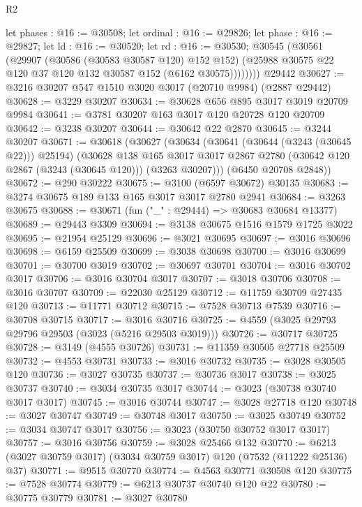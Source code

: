 \begin{lexlean}{R2}
\begin{coremodule}
          let phases : @16 := @30508;
          let ordinal : @16 := @29826;
          let phase : @16 := @29827;
          let ld : @16 := @30520;
          let rd : @16 := @30530;
          @30545
            (@30561
              (@29907
                (@30586 (@30583 @30587 @120) @152 @152)
                (@25988 @30575 @22 @120 @37 @120 @132 @30587 @152 (@6162 @30575))))))))
    @29442
@30627 := @3216 @30207 @547 @1510 @3020 @3017 (@20710 @9984) (@2887 @29442)
@30628 := @3229 @30207
@30634 := @30628 @656 @895 @3017 @3019 @20709 @9984
@30641 := @3781 @30207 @163 @3017 @120 @20728 @120 @20709
@30642 := @3238 @30207
@30644 := @30642 @22 @2870
@30645 := @3244 @30207
@30671 := @30618
    (@30627
      (@30634
        (@30641 (@30644 (@3243 (@30645 @22))) @25194)
        (@30628
          @138
          @165
          @3017
          @3017
          @2867
          @2780
          (@30642 @120 @2867 (@3243 (@30645 @120)))
          (@3263 @30207)))
      (@6450 @20708 @2848))
@30672 := @290 @30222
@30675 := @3100 (@6597 @30672) @30135
@30683 := @3274 @30675 @189 @133 @165 @3017 @3017 @2780 @2941
@30684 := @3263 @30675
@30688 := @30671 (fun ("_" : @29444) => @30683 @30684 @13377)
@30689 := @29443 @3309
@30694 := @3138 @30675 @1516 @1579 @1725 @3022
@30695 := @21954 @25129
@30696 := @3021 @30695
@30697 := @3016 @30696
@30698 := @6159 @25509
@30699 := @3038 @30698
@30700 := @3016 @30699
@30701 := @30700 @3019
@30702 := @30697 @30701
@30704 := @3016 @30702 @3017
@30706 := @3016 @30704 @3017
@30707 := @3018 @30706
@30708 := @3016 @30707
@30709 := @22030 @25129
@30712 := @11759 @30709 @27435 @120
@30713 := @11771 @30712
@30715 := @7528 @30713 @7539
@30716 := @30708 @30715
@30717 := @3016 @30716
@30725 := @4559 (@3025 @29793 @29796 @29503 (@3023 (@5216 @29503 @3019)))
@30726 := @30717 @30725
@30728 := @3149 (@4555 @30726)
@30731 := @11359 @30505 @27718 @25509
@30732 := @4553 @30731
@30733 := @3016 @30732
@30735 := @3028 @30505 @120
@30736 := @3027 @30735
@30737 := @30736 @3017
@30738 := @3025 @30737
@30740 := @3034 @30735 @3017
@30744 := @3023 (@30738 @30740 @3017 @3017)
@30745 := @3016 @30744
@30747 := @3028 @27718 @120
@30748 := @3027 @30747
@30749 := @30748 @3017
@30750 := @3025 @30749
@30752 := @3034 @30747 @3017
@30756 := @3023 (@30750 @30752 @3017 @3017)
@30757 := @3016 @30756
@30759 := @3028 @25466 @132
@30770 := @6213 (@3027 @30759 @3017) (@3034 @30759 @3017) @120 (@7532 (@11222 @25136) @37)
@30771 := @9515 @30770
@30774 := @4563 @30771 @30508 @120
@30775 := @7528 @30774
@30779 := @6213 @30737 @30740 @120 @22
@30780 := @30775 @30779
@30781 := @3027 @30780

\end{coremodule}
\end{lexlean}
